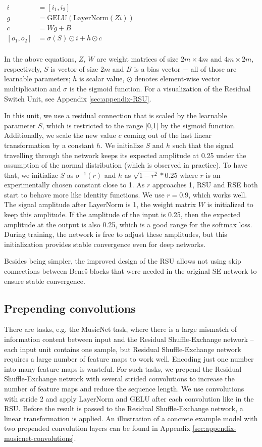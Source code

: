 \documentclass[letterpaper]{article} %
\begin{document}
\centerline{$\begin{aligned}
i &= [i_1, i_2] \\
g &= \text{GELU}(\text{LayerNorm}(Z i))\\
c &= Wg + B\\
[o_1, o_2] &= \sigma(S)\odot i + h \odot c \\
\end{aligned}$}

In the above equations, $Z$, $W$ are weight matrices of size $2m \times 4m$ and $4m \times 2m$, respectively, $S$ is vector of size $2m$ and $B$ is a bias vector $-$ all of those are learnable parameters; $h$ is scalar value, $\odot$ denotes element-wise vector multiplication and $\sigma$ is the sigmoid function. For a visualization of the Residual Switch Unit, see Appendix \ref{sec:appendix-RSU}.

In this unit, we use a residual connection that is scaled by the learnable parameter $S$, which is restricted to the range [0,1] by the sigmoid function. Additionally, we scale the new value $c$ coming out of the last linear transformation by a constant $h$. We initialize $S$ and $h$ such that the signal travelling through the network keeps its expected amplitude at 0.25 under the assumption of the normal distribution (which is observed in practice). To have that, we initialize $S$ as $\sigma^{-1}(r)$ and $h$ as $\sqrt{1-r^2}*0.25$ where $r$ is an experimentally chosen constant close to 1. As $r$ approaches 1, RSU and RSE both start to behave more like identity functions. We use $r=0.9$, which works well. The signal amplitude after LayerNorm is 1, the weight matrix $W$ is initialized to keep this amplitude. If the amplitude of the input is 0.25, then the expected amplitude at the output is also 0.25, which is a good range for the softmax loss. During training, the network is free to adjust these amplitudes, but this initialization provides stable convergence even for deep networks.

Besides being simpler, the improved design of the RSU allows not using skip connections between Bene\v{s} blocks that were needed in the original SE network to ensure stable convergence.

\subsection{Prepending convolutions}
There are tasks, e.g. the MusicNet task, where there is a large mismatch of information content between input and the Residual Shuffle-Exchange network -- each input unit contains one sample, but Residual Shuffle-Exchange network requires a large number of feature maps to work well. Encoding just one number into many feature maps is wasteful. For such tasks, we prepend the Residual Shuffle-Exchange network with several strided convolutions to increase the number of feature maps and reduce the sequence length. We use convolutions with stride 2 and apply LayerNorm and GELU after each convolution like in the RSU. Before the result is passed to the Residual Shuffle-Exchange network, a linear transformation is applied. An illustration of a concrete example model with two prepended convolution layers can be found in Appendix \ref{sec:appendix-musicnet-convolutions}.
\end{document}

